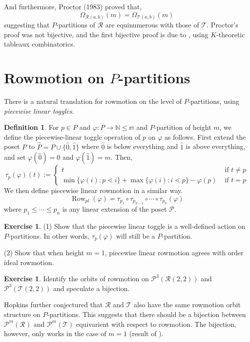 \documentclass[12pt]{amsart}
\newcommand{\rrr}[0]{\mathscr{R}}
\newcommand{\ttt}[0]{\mathscr{T}}
\theoremstyle{plain}
\theoremstyle{definition}
\newtheorem{definition}[theorem]{Definition}
\newtheorem{exercise}[theorem]{Exercise}
\DeclareMathOperator{\row}{Row}
\newcommand{\cal}[1]{\mathcal{#1}}
\begin{document}
And furthermore, Proctor (1983) proved that, 
\[\Omega_{\rrr(a,b)}(m) = \Omega_{\ttt(a,b)}(m)\]
suggesting that $P$-partitions of $\rrr$ are equinumerous with those of $\ttt$. Proctor's proof was not bijective, and the first bijective proof is due to \cite{HPPW18}, using $K$-theoretic tableaux combinatorics.
\section{Rowmotion on $P$-partitions}

There is a natural translation for rowmotion on the level of $P$-partitions, using \emph{piecewise linear toggles}.
\begin{definition}
	For $p\in P$  and $\varphi:P\to \mathbb{N\leq m}$ and $P$-partition of height $m$, we define the piecewise-linear toggle operation of $p$ on $\varphi$ as follows. First extend the poset $P$ to $\hat P=P\cup\{\hat 0,\hat 1\}$ where $\hat 0$ is below everything and $\hat 1$ is above everything, and set $\varphi(\hat 0)=0$ and $\varphi(\hat 1)=m$. Then,
	\[\tau_p(\varphi)(t) := \begin{cases}
		t&\text{ if }t\neq p\\
		\min\{\varphi(i):p\lessdot i\} +\max\{\varphi(i):i\lessdot p\}-\varphi(p)&\text{ if }t = p
	\end{cases}\]
	We then define piecewise linear rowmotion in a similar way.
	$$\row_{pl}(\varphi) =\tau_{p_1}\circ\tau_{p_{n-1}} \circ\cdots\circ\tau_{p_n}(\varphi)$$
where $p_1\le\cdots\le p_n$ is any linear extension of the poset $\mathcal P$.
\end{definition}
\begin{exercise}
	(1) Show that the piecewise linear toggle is a well-defined action on $P$-partitions. In other words, $\tau_p(\varphi)$ will still be a $P$-partition.
	
	(2) Show that when height $m=1$, piecewise linear rowmotion agrees with order ideal rowmotion.
\end{exercise}

\begin{exercise}
	Identify the orbits of rowmotion on $\cal P^3(\rrr(2,2))$ and $\cal P^3(\ttt(2,2))$ and speculate a bijection.
\end{exercise}


Hopkins \cite{hopkins2019minuscule} further conjectured that $\rrr$ and $\ttt$ also have the same rowmotion orbit structure on $P$-partitions. This suggests that there should be a bijection between $\cal P^m(\rrr)$ and $\cal P^m(\ttt)$ equivarient with respect to rowmotion. The \cite{HPPW18} bijection, however, only works in the case of $m=1$ (result of \cite{dao2020rowmotion}).
\end{document}
